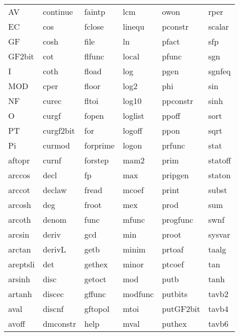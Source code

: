 \leer\leer
{\bf
\begin{tabular}{p{0.8in}p{0.8in}p{0.8in}p{0.8in}p{0.9in}p{0.8in}}
AV       & continue  & faintp    & lcm      & owon      & rper     \\
EC       & cos       & fclose    & linequ   & pconstr   & scalar   \\
GF       & cosh      & file      & ln       & pfact     & sfp      \\
GF2bit   & cot       & flfunc    & local    & pfunc     & sgn      \\
I        & coth      & fload     & log      & pgen      & sgnfeq   \\
MOD      & cper      & floor     & log2     & phi       & sin      \\
NF       & curec     & fltoi     & log10    & ppconstr  & sinh     \\
O        & curgf     & fopen     & loglist  & ppoff     & sort     \\
PT       & curgf2bit & for       & logoff   & ppon      & sqrt     \\
Pi       & curmod    & forprime  & logon    & prfunc    & stat     \\
aftopr   & curnf     & forstep   & mam2     & prim      & statoff  \\
arccos   & decl      & fp        & max      & pripgen   & staton   \\
arccot   & declaw    & fread     & mcoef    & print     & subst    \\
arcosh   & deg       & froot     & mex      & prod      & sum      \\
arcoth   & denom     & func      & mfunc    & progfunc  & swnf     \\
arcsin   & deriv     & gcd       & min      & proot     & sysvar   \\
arctan   & derivL    & getb      & minim    & prtoaf    & taalg    \\
areptsli & det       & gethex    & minor    & ptcoef    & tan      \\
arsinh   & disc      & getoct    & mod      & putb      & tanh     \\
artanh   & discec    & gffunc    & modfunc  & putbits   & tavb2    \\
aval     & discnf    & gftopol   & mtoi     & putGF2bit & tavb4    \\
avoff    & dmconstr  & help      & mval     & puthex    & tavb6    \\

\end{tabular}}
